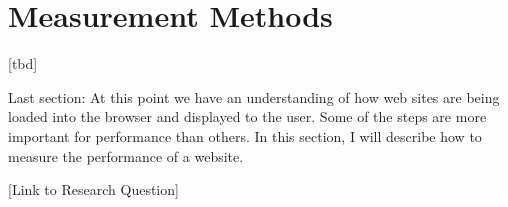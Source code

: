 	

















\section{Measurement Methods}


[tbd]



Last section: At this point we have an understanding of how web sites are being loaded into the browser and displayed to the user.
Some of the steps are more important for performance than others.
In this section, I will describe how to measure the performance of a website.


[Link to Research Question]



